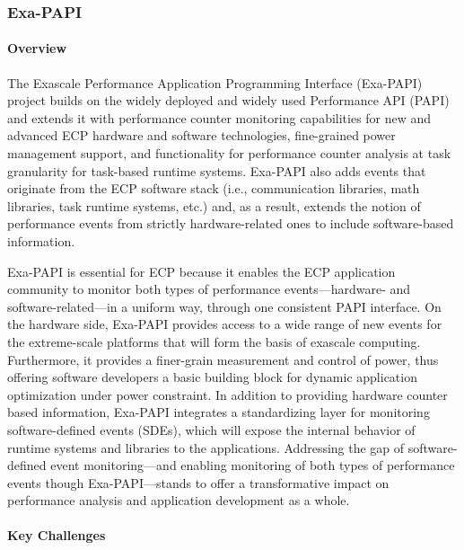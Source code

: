 \subsubsection{ Exa-PAPI}\label{subsubsect:exapapi}

\paragraph{Overview} 

The Exascale Performance Application Programming Interface (Exa-PAPI) project
builds on the widely deployed and widely used Performance API (PAPI) and
extends it with performance counter monitoring capabilities for new and
advanced ECP hardware and software technologies, fine-grained power management
support, and functionality for performance counter analysis at task granularity
for task-based runtime systems. Exa-PAPI also adds events that originate from
the ECP software stack (i.e., communication libraries, math libraries, task
runtime systems, etc.) and, as a result, extends the notion of performance
events from strictly hardware-related ones to include software-based information. 

Exa-PAPI is essential for ECP because it enables the ECP application community
to monitor both types of performance events---hardware- and
software-related---in a uniform way, through one consistent PAPI interface. On
the hardware side, Exa-PAPI provides access to a wide range of new
events for the extreme-scale platforms that will form the basis of exascale
computing. Furthermore, it provides a finer-grain measurement and control of
power, thus offering software developers a basic building block for dynamic
application optimization under power constraint.  In addition to providing
hardware counter based information, Exa-PAPI integrates a standardizing layer
for monitoring software-defined events (SDEs), which will expose the internal behavior
of runtime systems and libraries to the applications. Addressing the gap of
software-defined event monitoring---and enabling monitoring of both types of
performance events though Exa-PAPI---stands to offer a transformative impact on
performance analysis and application development as a whole.


\paragraph{Key Challenges}

